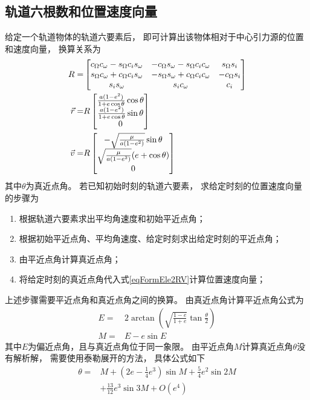 \subsection{轨道六根数和位置速度向量}
给定一个轨道物体的轨道六要素后，
即可计算出该物体相对于中心引力源的位置和速度向量，
换算关系为
\begin{align}
    R =& \left[\begin{matrix}
        c_{\Omega} c_{\omega}-s_{\Omega} c_{i} s_{\omega} & -c_{\Omega} s_{\omega}-s_{\Omega} c_{i} c_{\omega} & s_{\Omega} s_{i} \\
        s_{\Omega} c_{\omega}+c_{\Omega} c_{i} s_{\omega} & -s_{\Omega} s_{\omega}+c_{\Omega} c_{i} c_{\omega} & -c_{\Omega} s_{i} \\
        s_{i} s_{\omega} & s_{i} c_{\omega} & c_{i}
    \end{matrix}\right] \notag\\
    \vec{r} =& R\left[\begin{matrix}
        \frac{a(1-e^2)}{1+e\cos\theta}\cos\theta \\ \frac{a(1-e^2)}{1+e\cos\theta}\sin\theta \\ 0
    \end{matrix}\right] \notag\\
    \vec{v} =& R\left[\begin{matrix}
        -\sqrt{\frac{\mu}{a(1-e^2)}}\sin\theta \\ \sqrt{\frac{\mu}{a(1-e^2)}}(e+\cos\theta) \\ 0
    \end{matrix}\right] \label{eqFormEle2RV}\\
\end{align}
其中$\theta$为真近点角。
若已知初始时刻的轨道六要素，
求给定时刻的位置速度向量的步骤为
\begin{enumerate}[label={(\arabic*)}]\setlength{\itemsep}{-5pt}
    \item 根据轨道六要素求出平均角速度和初始平近点角；
    \item 根据初始平近点角、平均角速度、给定时刻求出给定时刻的平近点角；
    \item 由平近点角计算真近点角；
    \item 将给定时刻的真近点角代入式\eqref{eqFormEle2RV}计算位置速度向量；
\end{enumerate}
上述步骤需要平近点角和真近点角之间的换算。
由真近点角计算平近点角公式为
\begin{align*}
    E =& 2\arctan\left(\sqrt{\frac{1-e}{1+e}}\tan\frac{\theta}{2}\right) \\
    M =& E - e\sin{E}
\end{align*}
其中$E$为偏近点角，且与真近点角位于同一象限。
由平近点角$M$计算真近点角$\theta$没有解析解，
需要使用泰勒展开的方法，
具体公式如下\cite{msmart1977}
\begin{align*}
    \theta =& M+\left(2e-\frac{1}{4}e^3\right)\sin{M}
    + {\frac{5}{4}}e^2\sin{2M} \\
    &+ {\frac{13}{12}}e^3\sin{3M}+O(e^4)
\end{align*}

